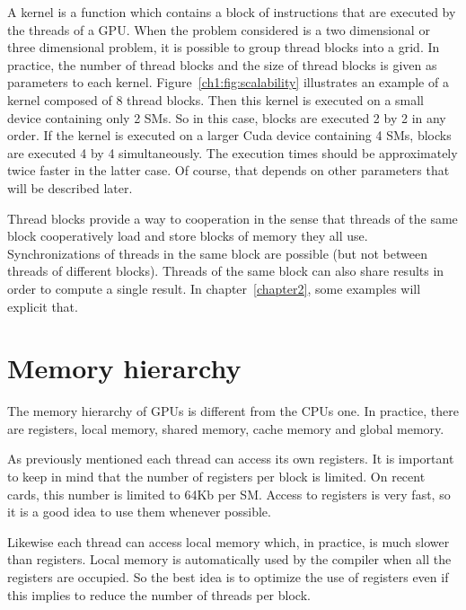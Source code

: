 A kernel is a function which  contains a block of instructions that are executed
by the  threads of a GPU.   When the problem considered  is a two  dimensional or three
dimensional  problem,  it is  possible  to group  thread  blocks  into a grid.   In
practice, the number of  thread blocks and the size of thread  blocks is given as
parameters  to  each  kernel.   Figure~\ref{ch1:fig:scalability}  illustrates  an
example of a kernel composed of 8 thread blocks. Then this kernel is executed on
a small device containing only 2 SMs.  So in  this case, blocks are executed 2
by 2 in any order.  If the kernel is executed on a larger Cuda device containing
4 SMs, blocks are executed 4 by 4 simultaneously.  The execution times should be
approximately twice faster in the latter  case. Of course, that depends on other
parameters that will be described later.

Thread blocks provide a way to cooperation  in the sense that threads of the same
block   cooperatively    load   and   store   blocks   of    memory   they   all
use. Synchronizations of threads in the same block are possible (but not between
threads of different  blocks). Threads of the same block  can also share results
in order  to compute a  single result. In chapter~\ref{chapter2},  some examples
will explicit that.


\section{Memory hierarchy}

The memory hierarchy of  GPUs is different from the CPUs
one.  In practice,  there are registers, local
memory,                               shared
memory,                               cache
memory              and              global
memory.


As  previously  mentioned each  thread  can access  its  own  registers.  It  is
important to keep in mind that the  number of registers per block is limited. On
recent cards,  this number is  limited to 64Kb  per SM.  Access to  registers is
very fast, so it is a good idea to use them whenever possible.

Likewise each thread can access local  memory which, in practice, is much slower
than registers.  Local memory is automatically used by the compiler when all the
registers are  occupied. So the  best idea is  to optimize the use  of registers
even if this implies to reduce the number of threads per block.

